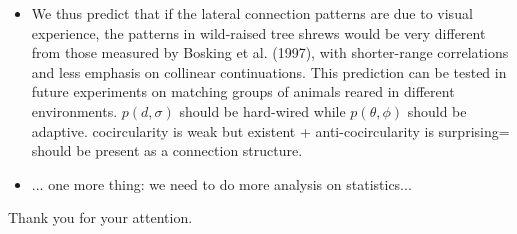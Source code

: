 \documentclass[10pt,ignorenonframetext]{beamer}%
\begin{document}
{{\begin{itemize}
		\item We thus predict that if the lateral connection patterns are due to visual experience, the patterns in wild-raised tree shrews would be very different from those measured by Bosking et al. (1997), with shorter-range correlations and less emphasis on collinear continuations. This prediction can be tested in future experiments on matching groups of animals reared in different environments. $p(d,\sigma)$ should be hard-wired while $p(\theta, \phi)$ should be adaptive. cocircularity is weak but existent + anti-cocircularity is surprising= should be present as a connection structure. %
		\item ... one more thing: we need to do more analysis on statistics...
	\end{itemize}
	Thank you for your attention.
	} 
}%
\end{document}
